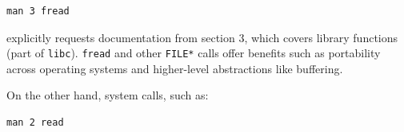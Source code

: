 \begin{center}
\begin{verbatim}
man 3 fread
\end{verbatim}
\end{center}

explicitly requests documentation from section 3, which covers library functions (part of \texttt{libc}). \texttt{fread} and other \texttt{FILE*} calls offer benefits such as portability across operating systems and higher-level abstractions like buffering.

On the other hand, system calls, such as:
\begin{center}
\begin{verbatim}
man 2 read
\end{verbatim}
\end{center}

